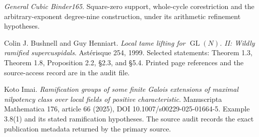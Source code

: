 \documentclass[11pt]{article}
\theoremstyle{definition}\newtheorem{definition}[proposition]{Definition}
\newcommand{\GL}{\operatorname{GL}}
\begin{document}
\begin{description}[leftmargin=1.3cm,style=nextline]
\item[B165] \emph{General Cubic Binder165}. Square-zero support, whole-cycle corestriction and the arbitrary-exponent degree-nine construction, under its arithmetic refinement hypotheses.
\item[BH99] Colin J. Bushnell and Guy Henniart. \emph{Local tame lifting for $\GL(N)$. II: Wildly ramified supercuspidals}. Ast\'erisque 254, 1999. Selected statements: Theorem 1.3, Theorem 1.8, Proposition 2.2, \S2.3, and \S5.4. Printed page references and the source-access record are in the audit file.
\item[Imai] Koto Imai. \emph{Ramification groups of some finite Galois extensions of maximal nilpotency class over local fields of positive characteristic}. Manuscripta Mathematica 176, article 66 (2025), DOI 10.1007/s00229-025-01664-5. Example 3.8(1) and its stated ramification hypotheses. The source audit records the exact publication metadata returned by the primary source.
\end{description}
\end{document}
